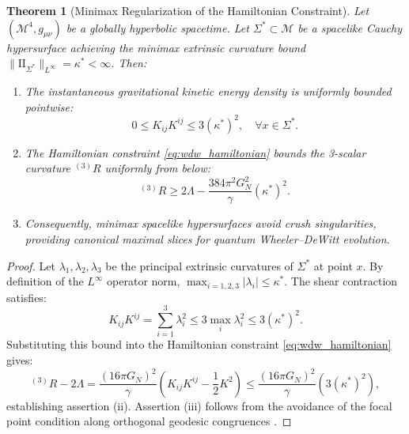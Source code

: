 \documentclass[11pt,a4paper,reqno]{amsart}
\newtheorem{theorem}{Theorem}[section]
\theoremstyle{definition}
\numberwithin{equation}{section}
\newcommand{\II}{\mathrm{I\!I}}
\begin{document}
\begin{theorem}[Minimax Regularization of the Hamiltonian Constraint]
\label{thm:minimax_hamiltonian_regularization}
Let $(\mathcal{M}^4, g_{\mu\nu})$ be a globally hyperbolic spacetime. Let $\Sigma^* \subset \mathcal{M}$ be a spacelike Cauchy hypersurface achieving the minimax extrinsic curvature bound $\|\II_{\Sigma^*}\|_{L^\infty} = \kappa^* < \infty$. Then:
\begin{enumerate}[label=(\roman*)]
    \item The instantaneous gravitational kinetic energy density is uniformly bounded pointwise:
    \begin{equation}
        \label{eq:shear_bound}
        0 \le K_{ij} K^{ij} \le 3 (\kappa^*)^2, \quad \forall x \in \Sigma^*.
    \end{equation}
    \item The Hamiltonian constraint \eqref{eq:wdw_hamiltonian} bounds the 3-scalar curvature ${}^{(3)}R$ uniformly from below:
    \begin{equation}
        {}^{(3)}R \ge 2\Lambda - \frac{384\pi^2 G_N^2}{\gamma} (\kappa^*)^2.
    \end{equation}
    \item Consequently, minimax spacelike hypersurfaces avoid crush singularities, providing canonical maximal slices for quantum Wheeler--DeWitt evolution.
\end{enumerate}
\end{theorem}
\begin{proof}
Let $\lambda_1, \lambda_2, \lambda_3$ be the principal extrinsic curvatures of $\Sigma^*$ at point $x$. By definition of the $L^\infty$ operator norm, $\max_{i=1,2,3} |\lambda_i| \le \kappa^*$. The shear contraction satisfies:
\begin{equation}
    K_{ij} K^{ij} = \sum_{i=1}^3 \lambda_i^2 \le 3 \max_i \lambda_i^2 \le 3 (\kappa^*)^2.
\end{equation}
Substituting this bound into the Hamiltonian constraint \eqref{eq:wdw_hamiltonian} gives:
\begin{equation}
    {}^{(3)}R - 2\Lambda = \frac{(16\pi G_N)^2}{\gamma}\left( K_{ij} K^{ij} - \frac{1}{2} K^2 \right) \le \frac{(16\pi G_N)^2}{\gamma} \left(3 (\kappa^*)^2\right),
\end{equation}
establishing assertion (ii). Assertion (iii) follows from the avoidance of the focal point condition along orthogonal geodesic congruences \cite{monarch2026noneuclidean}.
\end{proof}
\end{document}
